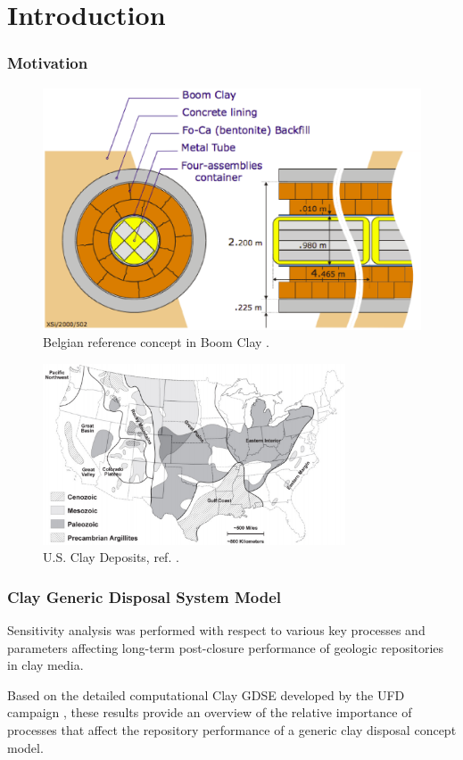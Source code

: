 
\section{Introduction}
\begin{frame}[c]
  \frametitle{Motivation}
   \begin{minipage}{0.44\textwidth}
     \begin{figure}[h!]
         \includegraphics[height=.8\textheight]{belgianClayRedImp.eps}
         \caption{Belgian reference concept in Boom Clay 
         \cite{von_lensa_red-impact_2008}.}
     \end{figure}
     \begin{figure}[h!]
         \includegraphics[width=0.8\textwidth]{clayGonzales.eps}
         \caption{U.S. Clay Deposits, ref. \cite{gonzales_shales_1985}.}
     \end{figure}
   \end{minipage}
   \hspace{0.01cm}
\end{frame}

\begin{frame}[c]
  \frametitle{Clay Generic Disposal System Model}
Sensitivity analysis was performed with respect to various key processes and 
parameters affecting long-term post-closure performance of geologic repositories 
in clay media. 

Based on the detailed computational Clay 
\gls{GDSE} developed by the \gls{UFD} campaign \cite{clayton_generic_2011}, 
these results provide an overview of the relative importance of processes 
that affect the repository performance of a generic clay disposal concept model. 
\end{frame}


